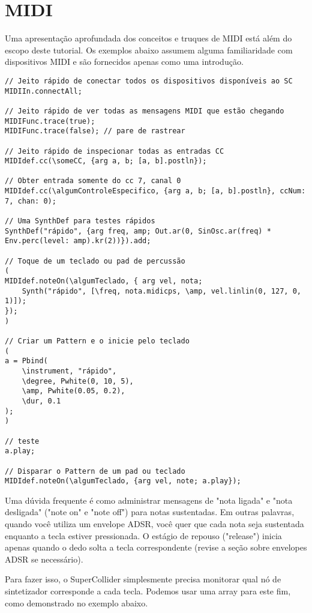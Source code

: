 \section{MIDI}

Uma apresentação aprofundada dos conceitos e truques de MIDI está além do escopo deste tutorial. Os exemplos abaixo assumem alguma familiaridade com dispositivos MIDI e são fornecidos apenas como uma introdução.


\begin{lstlisting}[style=SuperCollider-IDE, basicstyle=\scttfamily\footnotesize]
// Jeito rápido de conectar todos os dispositivos disponíveis ao SC
MIDIIn.connectAll;

// Jeito rápido de ver todas as mensagens MIDI que estão chegando
MIDIFunc.trace(true);
MIDIFunc.trace(false); // pare de rastrear

// Jeito rápido de inspecionar todas as entradas CC
MIDIdef.cc(\someCC, {arg a, b; [a, b].postln});

// Obter entrada somente do cc 7, canal 0
MIDIdef.cc(\algumControleEspecifico, {arg a, b; [a, b].postln}, ccNum: 7, chan: 0);

// Uma SynthDef para testes rápidos
SynthDef("rápido", {arg freq, amp; Out.ar(0, SinOsc.ar(freq) * Env.perc(level: amp).kr(2))}).add;

// Toque de um teclado ou pad de percussão
(
MIDIdef.noteOn(\algumTeclado, { arg vel, nota;
	Synth("rápido", [\freq, nota.midicps, \amp, vel.linlin(0, 127, 0, 1)]);
});
)

// Criar um Pattern e o inicie pelo teclado
(
a = Pbind(
	\instrument, "rápido",
	\degree, Pwhite(0, 10, 5),
	\amp, Pwhite(0.05, 0.2),
	\dur, 0.1
);
)

// teste
a.play;

// Disparar o Pattern de um pad ou teclado
MIDIdef.noteOn(\algumTeclado, {arg vel, note; a.play});
\end{lstlisting}

Uma dúvida frequente é como administrar mensagens de "nota ligada" e "nota desligada" ("note on" e "note off") para notas sustentadas. Em outras palavras, quando você utiliza um envelope ADSR, você quer que cada nota seja sustentada enquanto a tecla estiver pressionada. O estágio de repouso ("release") inicia apenas quando o dedo solta a tecla correspondente (revise a seção sobre envelopes ADSR se necessário).

Para fazer isso, o SuperCollider simplesmente precisa monitorar qual nó de sintetizador corresponde a cada tecla. Podemos usar uma array para este fim, como demonstrado no exemplo abaixo. 

